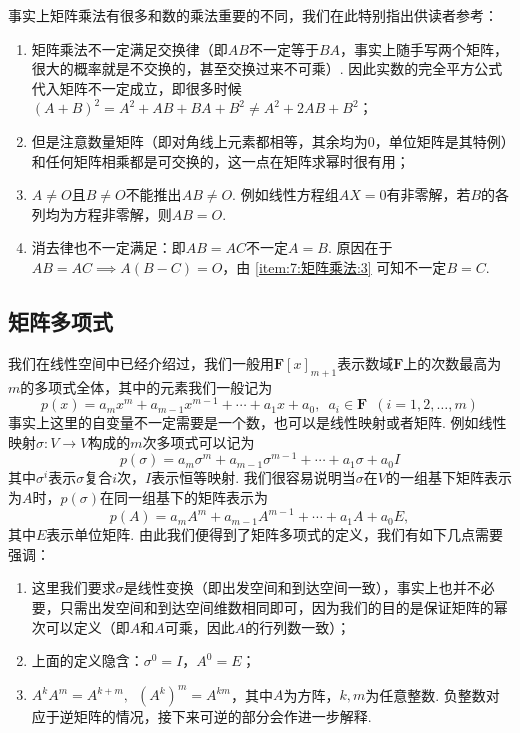 事实上矩阵乘法有很多和数的乘法重要的不同，我们在此特别指出供读者参考：
\begin{enumerate}[label=(\arabic*)]
    \item 矩阵乘法不一定满足交换律（即$AB$不一定等于$BA$，事实上随手写两个矩阵，很大的概率就是不交换的，甚至交换过来不可乘）. 因此实数的完全平方公式代入矩阵不一定成立，即很多时候$(A+B)^2=A^2+AB+BA+B^2\neq A^2+2AB+B^2$；

    \item 但是注意数量矩阵（即对角线上元素都相等，其余均为0，单位矩阵是其特例）和任何矩阵相乘都是可交换的，这一点在矩阵求幂时很有用；

    \item \label{item:7:矩阵乘法:3}
          $A\neq O$且$B\neq O$不能推出$AB\neq O$. 例如线性方程组$AX = 0$有非零解，若$B$的各列均为方程非零解，则$AB = O$.

    \item 消去律也不一定满足：即$AB = AC$不一定$A = B$. 原因在于$AB=AC \implies A(B-C)=O$，由 \ref*{item:7:矩阵乘法:3} 可知不一定$B = C$.
\end{enumerate}

\subsection{矩阵多项式}

我们在线性空间中已经介绍过，我们一般用$\mathbf{F}[x]_{m+1}$表示数域$\mathbf{F}$上的次数最高为$m$的多项式全体，其中的元素我们一般记为
\[p(x)=a_mx^m+a_{m-1}x^{m-1}+\cdots+a_1x+a_0,\enspace a_i\in\mathbf{F}\enspace(i=1,2,\ldots,m)\]
事实上这里的自变量不一定需要是一个数，也可以是线性映射或者矩阵. 例如线性映射$\sigma:V\to V$构成的$m$次多项式可以记为
\[p(\sigma)=a_m\sigma^m+a_{m-1}\sigma^{m-1}+\cdots+a_1\sigma+a_0I\]
其中$\sigma^i$表示$\sigma$复合$i$次，$I$表示恒等映射. 我们很容易说明当$\sigma$在$V$的一组基下矩阵表示为$A$时，$p(\sigma)$在同一组基下的矩阵表示为
\[p(A)=a_mA^m+a_{m-1}A^{m-1}+\cdots+a_1A+a_0E,\]
其中$E$表示单位矩阵. 由此我们便得到了矩阵多项式的定义，我们有如下几点需要强调：
\begin{enumerate}
    \item 这里我们要求$\sigma$是线性变换（即出发空间和到达空间一致），事实上也并不必要，只需出发空间和到达空间维数相同即可，因为我们的目的是保证矩阵的幂次可以定义（即$A$和$A$可乘，因此$A$的行列数一致）；

    \item 上面的定义隐含：$\sigma^0 = I$，$A^0=E$；

    \item $A^kA^m=A^{k+m},\enspace (A^k)^m=A^{km}$，其中$A$为方阵，$k,m$为任意整数. 负整数对应于逆矩阵的情况，接下来可逆的部分会作进一步解释.
\end{enumerate}

